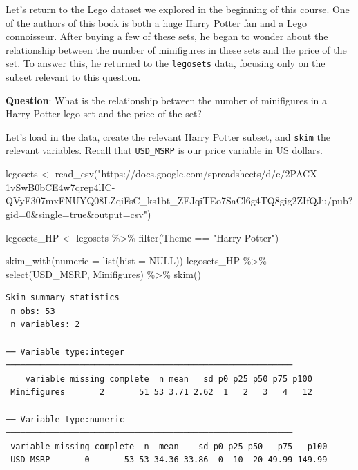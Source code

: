 \documentclass[
  letterpaper,
  DIV=11,
  numbers=noendperiod]{scrreprt}
\newenvironment{Shaded}{\begin{snugshade}}{\end{snugshade}}
\newcommand{\AttributeTok}[1]{\textcolor[rgb]{0.40,0.45,0.13}{#1}}
\newcommand{\ConstantTok}[1]{\textcolor[rgb]{0.56,0.35,0.01}{#1}}
\newcommand{\FunctionTok}[1]{\textcolor[rgb]{0.28,0.35,0.67}{#1}}
\newcommand{\NormalTok}[1]{\textcolor[rgb]{0.00,0.23,0.31}{#1}}
\newcommand{\OtherTok}[1]{\textcolor[rgb]{0.00,0.23,0.31}{#1}}
\newcommand{\SpecialCharTok}[1]{\textcolor[rgb]{0.37,0.37,0.37}{#1}}
\newcommand{\StringTok}[1]{\textcolor[rgb]{0.13,0.47,0.30}{#1}}
\theoremstyle{definition}
\theoremstyle{remark}
\begin{document}
Let's return to the Lego dataset we explored in the beginning of this
course. One of the authors of this book is both a huge Harry Potter fan
and a Lego connoisseur. After buying a few of these sets, he began to
wonder about the relationship between the number of minifigures in these
sets and the price of the set. To answer this, he returned to the
\texttt{legosets} data, focusing only on the subset relevant to this
question.

\textbf{Question}: What is the relationship between the number of
minifigures in a Harry Potter lego set and the price of the set?

Let's load in the data, create the relevant Harry Potter subset, and
\texttt{skim} the relevant variables. Recall that \texttt{USD\_MSRP} is
our price variable in US dollars.

\begin{Shaded}
\begin{Highlighting}[]
\NormalTok{legosets }\OtherTok{\textless{}{-}} \FunctionTok{read\_csv}\NormalTok{(}\StringTok{"https://docs.google.com/spreadsheets/d/e/2PACX{-}1vSwB0bCE4w7qrep4lIC{-}QVyF307mxFNUYQ08LZqiFsC\_ks1bt\_ZEJqiTEo7SaCl6g4TQ8gig2ZIfQJu/pub?gid=0\&single=true\&output=csv"}\NormalTok{)}

\NormalTok{legosets\_HP }\OtherTok{\textless{}{-}}\NormalTok{ legosets }\SpecialCharTok{\%\textgreater{}\%} 
  \FunctionTok{filter}\NormalTok{(Theme }\SpecialCharTok{==} \StringTok{"Harry Potter"}\NormalTok{)}

\FunctionTok{skim\_with}\NormalTok{(}\AttributeTok{numeric =} \FunctionTok{list}\NormalTok{(}\AttributeTok{hist =} \ConstantTok{NULL}\NormalTok{))}
\NormalTok{legosets\_HP }\SpecialCharTok{\%\textgreater{}\%} 
  \FunctionTok{select}\NormalTok{(USD\_MSRP, Minifigures) }\SpecialCharTok{\%\textgreater{}\%} 
  \FunctionTok{skim}\NormalTok{()}
\end{Highlighting}
\end{Shaded}

\begin{verbatim}
Skim summary statistics
 n obs: 53 
 n variables: 2 

── Variable type:integer ──────────────────────────────────────────────────────────
    variable missing complete  n mean   sd p0 p25 p50 p75 p100
 Minifigures       2       51 53 3.71 2.62  1   2   3   4   12 

── Variable type:numeric ──────────────────────────────────────────────────────────
 variable missing complete  n  mean    sd p0 p25 p50   p75   p100
 USD_MSRP       0       53 53 34.36 33.86  0  10  20 49.99 149.99
\end{verbatim}
\end{document}
